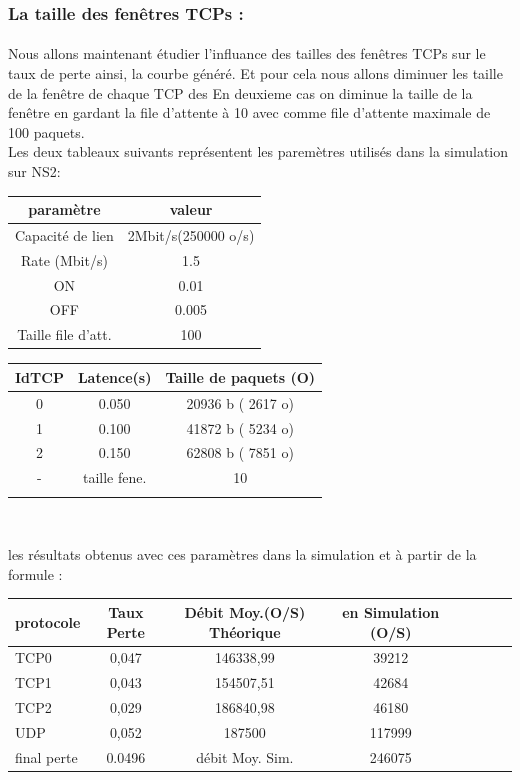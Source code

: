 \documentclass[a4paper]{report}
\theoremstyle{definition}
\begin{document}


\subsubsection*{La taille des fenêtres TCPs :}
\paragraph*{}
   Nous allons maintenant étudier l'influance des tailles des fenêtres TCPs sur le taux de perte ainsi, la courbe généré. Et pour cela nous allons diminuer les taille de la fenêtre de chaque TCP  des  En deuxieme cas on diminue la taille de la fenêtre en gardant la file d'attente à 10 avec comme file d'attente maximale de 100 paquets.\\  
   Les deux tableaux suivants représentent les paremètres utilisés dans la simulation sur NS2:
   \begin{center}
   

\begin{tabular}{|c|c|}
\hline
 paramètre  & valeur \\ \hline
 
 Capacité de lien & 2Mbit/s(250000 o/s) \\ 
 Rate (Mbit/s) & 1.5 \\ 
 ON & 0.01\\ 
 OFF & 0.005 \\ 
 Taille file d'att. & 100\\
\hline
\end{tabular}
\begin{tabular}{|c|c|c|}
\hline
 IdTCP  & Latence(s) & Taille de paquets (O) \\ \hline
 
 0 & 0.050 & 20936 b ( 2617 o)	 \\ 
 1 & 0.100 & 41872 b ( 5234 o)	 \\ 
 2 & 0.150 & 62808 b ( 7851 o)	 \\ 
 - & taille fene. & 10\\ 
 & & \\
 
\hline
\end{tabular}\\
   \end{center}
les résultats obtenus avec ces paramètres dans la simulation et à partir de la formule : \\

\begin{tabular}{|l|c|c|c|c|c|c|c|}
\hline
 protocole & Taux Perte & Débit Moy.(O/S) Théorique & en Simulation (O/S) \\ \hline
 TCP0 & 0,047 &  146338,99 &  39212     \\
 TCP1 & 0,043 &  154507,51 &  42684     \\ 
 TCP2 & 0,029 &  186840,98 &  46180     \\ 
 UDP  & 0,052 &  187500    &  117999    \\ 
 \hline
 final perte & 0.0496  & débit Moy. Sim. & 246075   \\ 
\hline
\end{tabular}
\end{document}
